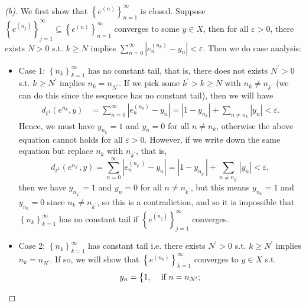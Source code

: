 \begin{proof}[(b)]
  We first show that \(\left\{ e^{(n)} \right\}_{n=1}^{\infty}  \) is closed. Suppose \(\left\{ e^{(n_j)} \right\}_{j=1}^{\infty} \subseteq \left\{ e^{(n)} \right\}_{n=1}^{\infty} \) converges to some \(y \in X\), then for all \(\varepsilon > 0\), there exists \(N > 0\) s.t. \(k \ge N\) implies \(\sum_{n=0}^{\infty} \left\vert e^{(n_k)}_n - y_n \right\vert < \varepsilon   \). Then we do case analysis: 
  \begin{itemize}
    \item Case 1: \(\left\{ n_k \right\}_{k=1}^{\infty}  \) has no constant tail, that is, there does not exists \(N^{\prime}  > 0\) s.t. \(k \ge N^{\prime} \) implies \(n_k = n_{N^{\prime} }\). If we pick some \(k^{\prime} > k \ge N\) with \(n_k \neq n_{k^{\prime} }\) (we can do this since the sequence has no constant tail), then we will have 
    \begin{align*}
      d_{\ell ^1} \left( e^{n_k}, y \right) &= \sum_{n=0}^{\infty} \left\vert e_n^{(n_k)} - y_n \right\vert = \left\vert 1 - y_{n_k} \right\vert + \sum_{n \neq n_k} \left\vert y_n \right\vert < \varepsilon. 
    \end{align*}
    Hence, we must have \(y_{n_k} = 1\) and \(y_n = 0\) for all \(n \neq n_k\), otherwise the above equation cannot holds for all \(\varepsilon > 0\). However, if we write down the same equation but replace \(n_k\) with \(n_{k^{\prime} }\), that is,
    \[
      d_{\ell ^1} \left( e^{n_{k^{\prime}} }, y \right) = \sum_{n=0}^{\infty} \left\vert e_n^{(n_{k^{\prime} })} - y_n \right\vert = \left\vert 1 - y_{n_{k^{\prime} }} \right\vert + \sum_{n \neq n_{k^{\prime} }} \left\vert y_n \right\vert < \varepsilon, 
    \] then we have \(y_{n_{k^{\prime} }} = 1\) and \(y_{n} = 0\) for all \(n \neq n_{k^{\prime} }\), but this means \(y_{n_k} = 1\) and \(y_{n_k} = 0\) since \(n_k \neq n_{k^{\prime} }\), so this is a contradiction, and so it is impossible that \(\left\{ n_k \right\}_{k=1}^{\infty}  \) has no constant tail if \(\left\{ e^{(n_j)} \right\}_{j=1}^{\infty}  \) converges.     
    \item Case 2: \(\left\{ n_k \right\}_{k=1}^{\infty}  \) has constant tail i.e. there exists \(N^{\prime} >0\) s.t. \(k \ge N^{\prime} \) implies \(n_k = n_{N^{\prime} }\). If so, we will show that \(\left\{ e^{(n_k)} \right\}_{k=1}^{\infty}  \) converges to \(y \in X\) s.t. 
    \[
      y_n = \begin{dcases}
        1, &\text{ if } n = n_{N^{\prime} } ;\\

\end{dcases}\]
\end{itemize}
\end{proof}
